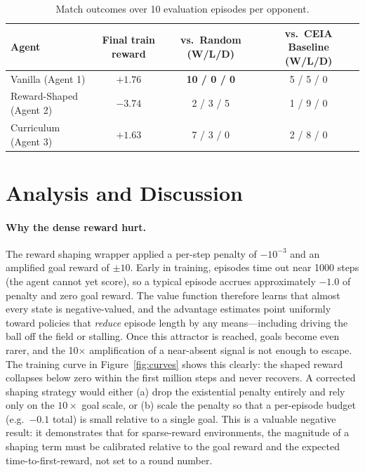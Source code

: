 \documentclass{article}
\begin{document}
\begin{table}[h]
\centering
\small
\begin{tabular}{lccc}
\toprule
Agent & Final train reward & vs.\ Random (W/L/D) & vs.\ CEIA Baseline (W/L/D) \\
\midrule
Vanilla (Agent 1)     & $+1.76$ & \textbf{10 / 0 / 0} & 5 / 5 / 0 \\
Reward-Shaped (Agent 2) & $-3.74$ & 2 / 3 / 5 & 1 / 9 / 0 \\
Curriculum (Agent 3)  & $+1.63$ & 7 / 3 / 0 & 2 / 8 / 0 \\
\bottomrule
\end{tabular}
\caption{Match outcomes over 10 evaluation episodes per opponent.}
\label{tab:eval}
\end{table}


\section{Analysis and Discussion}

\paragraph{Why the dense reward hurt.}
The reward shaping wrapper applied a per-step penalty of $-10^{-3}$ and an amplified goal reward of $\pm 10$.
Early in training, episodes time out near 1000 steps (the agent cannot yet score), so a typical episode accrues approximately $-1.0$ of penalty and zero goal reward.
The value function therefore learns that almost every state is negative-valued, and the advantage estimates point uniformly toward policies that \emph{reduce} episode length by any means---including driving the ball off the field or stalling.
Once this attractor is reached, goals become even rarer, and the 10$\times$ amplification of a near-absent signal is not enough to escape.
The training curve in Figure~\ref{fig:curves} shows this clearly: the shaped reward collapses below zero within the first million steps and never recovers. A corrected shaping strategy would either (a) drop the existential penalty entirely and rely only on the $10\times$ goal scale, or (b) scale the penalty so that a per-episode budget (e.g.\ $-0.1$ total) is small relative to a single goal.
This is a valuable negative result: it demonstrates that for sparse-reward environments, the magnitude of a shaping term must be calibrated relative to the goal reward and the expected time-to-first-reward, not set to a round number.
\end{document}
